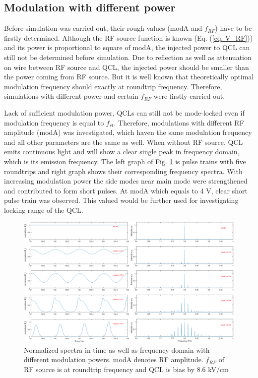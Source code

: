 \documentclass[11pt,final]{scrbook}
\begin{document}
\subsection{Modulation with different power} 
Before simulation was carried out, their rough values (modA and $f_{RF}$) have to be firstly determined. Although the RF source function is known (Eq. (\ref{eq. V_RF})) and its power is proportional to square of modA, the injected power to QCL can still not be determined before simulation. Due to reflection as well as attenuation on wire between RF source and QCL, the injected power should be smaller than the power coming from RF source. But it is well known that theoretically optimal modulation frequency should exactly at roundtrip frequency. Therefore, simulations with different power and certain $f_{RF}$ were firstly carried out.

Lack of sufficient modulation power, QCLs can still not be mode-locked even if modulation frequency is equal to $f_{rt}$. Therefore, modulations with different RF amplitude (modA) was investigated, which haven the same modulation frequency and all other parameters are the same as well. When without RF source, QCL emits continuous light and will show a clear single peak in frequency domain, which is its emission frequency. The left graph of Fig. \ref{fig:modA_fspectra} is pulse trains with five roundtrips and right graph shows their corresponding frequency spectra. With increasing modulation power the side modes near main mode were strengthened and contributed to form short pulses. At modA which equals to 4 V, clear short pulse train was observed. This valued would be further used for investigating locking range of the QCL.
\begin{figure}[htbp]
\begin{center}
\includegraphics[scale=0.28]{images/modA_spectra.pdf}
\caption{Normalized spectra in time as well as frequency domain with different modulation powers. modA denotes RF amplitude. $f_{RF}$ of RF source is at roundtrip frequency and QCL is bias by 8.6 kV/cm}
\label{fig:modA_fspectra}
\end{center}
\end{figure}
\end{document}

